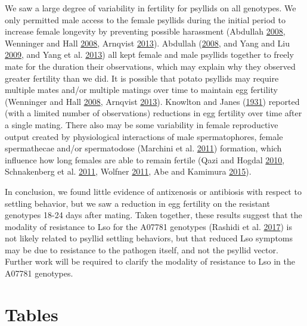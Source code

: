 \documentclass[]{article}
\begin{document}
We saw a large degree of variability in fertility for psyllids on all
genotypes. We only permitted male access to the female psyllids during
the initial period to increase female longevity by preventing possible
harassment (Abdullah \protect\hyperlink{ref-Abdullah2008}{2008},
Wenninger and Hall \protect\hyperlink{ref-Wenninger2008}{2008}, Arnqvist
\protect\hyperlink{ref-Arnqvist2013}{2013}). Abdullah
(\protect\hyperlink{ref-Abdullah2008}{2008}, and Yang and Liu
\protect\hyperlink{ref-Yang2009}{2009}, and Yang et al.
\protect\hyperlink{ref-Yang2013}{2013}) all kept female and male
psyllids together to freely mate for the duration their observations,
which may explain why they observed greater fertility than we did. It is
possible that potato psyllids may require multiple mates and/or multiple
matings over time to maintain egg fertility (Wenninger and Hall
\protect\hyperlink{ref-Wenninger2008}{2008}, Arnqvist
\protect\hyperlink{ref-Arnqvist2013}{2013}). Knowlton and Janes
(\protect\hyperlink{ref-Knowlton1931}{1931}) reported (with a limited
number of observations) reductions in egg fertility over time after a
single mating. There also may be some variability in female reproductive
output created by physiological interactions of male spermatophores,
female spermathecae and/or spermatodose (Marchini et al.
\protect\hyperlink{ref-Marchini2011}{2011}) formation, which influence
how long females are able to remain fertile (Qazi and Hogdal
\protect\hyperlink{ref-Qazi2010}{2010}, Schnakenberg et al.
\protect\hyperlink{ref-Schnakenberg2011}{2011}, Wolfner
\protect\hyperlink{ref-Wolfner2011}{2011}, Abe and Kamimura
\protect\hyperlink{ref-Abe2015}{2015}).

In conclusion, we found little evidence of antixenosis or antibiosis
with respect to settling behavior, but we saw a reduction in egg
fertility on the resistant genotypes 18-24 days after mating. Taken
together, these results suggest that the modality of resistance to Lso
for the A07781 genotypes (Rashidi et al.
\protect\hyperlink{ref-Rashidi2017}{2017}) is not likely related to
psyllid settling behaviors, but that reduced Lso symptoms may be due to
resistance to the pathogen itself, and not the psyllid vector. Further
work will be required to clarify the modality of resistance to Lso in
the A07781 genotypes.

\hypertarget{ch:tables}{%
\section{Tables}\label{ch:tables}}
\end{document}
